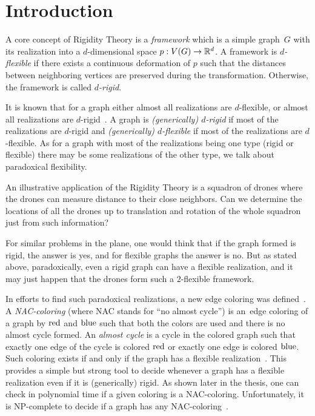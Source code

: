 
\chapter*{Introduction}
\setcounter{page}{1}


A core concept of Rigidity Theory is a \emph{framework} which is
a simple graph~\(G\) with its realization
into a \(d\)-dimensional space \(p: V(G) \to \mathbb{R}^d\).
A framework is \emph{\( d \)-flexible} if there exists
a continuous deformation of \( p \) such that
the distances between neighboring vertices are preserved during the transformation.
Otherwise, the framework is called \emph{\( d \)-rigid}.

It is known that for a graph either almost all realizations are \( d \)-flexible,
or almost all realizations are \( d \)-rigid~\cite{generically_rigid_graphs}.
A graph is \emph{(generically) \( d \)-rigid} if most of the realizations are \( d \)-rigid
and \emph{(generically) \( d \)-flexible} if most of the realizations are \( d \)-flexible.
%
As for a graph with most of the realizations being one type (rigid or flexible)
there may be some realizations of the other type,
we talk about paradoxical flexibility.

An illustrative application of the Rigidity Theory is a squadron of drones
where the drones can measure distance to their close neighbors.
Can we determine the locations of all the drones
up to translation and rotation of the whole squadron
just from such information?

For similar problems in the plane,
one would think that if the graph formed is rigid, the answer is yes, and
for flexible graphs the answer is no.
But as stated above, paradoxically, even a rigid graph can have a flexible realization,
and it may just happen that the drones form such a \( 2 \)-flexible framework.

In efforts to find such paradoxical realizations,
a new edge coloring was defined~\cite{legersky_original}.
A \emph{NAC-coloring} (where NAC stands for ``no almost cycle'')
is an~edge coloring of a graph by \( \text{red} \) and \( \text{blue} \)
such that both the colors are used and there is no almost cycle formed.
An \emph{almost cycle} is a cycle in the colored graph such that exactly one
edge of the cycle is colored \( \text{red} \) or exactly one edge is colored \( \text{blue} \).
Such coloring exists if and only if the graph has a flexible realization~\cite{legersky_original}.
This provides a simple but strong tool to decide whenever a graph has
a flexible realization even if it is (generically) rigid.
As shown later in the thesis, one can check in polynomial time
if a given coloring is a NAC-coloring.
Unfortunately, it is NP-complete to decide if a graph has any NAC-coloring~\cite{np_complete}.

